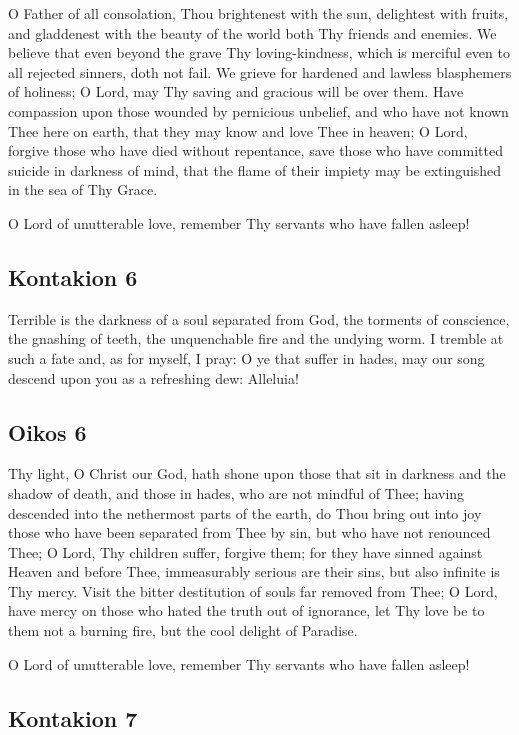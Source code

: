 O Father of all consolation, Thou brightenest with the sun, delightest with fruits, and gladdenest with the beauty of the world both Thy friends and enemies. We believe that even beyond the grave Thy loving-kindness, which is merciful even to all rejected sinners, doth not fail. We grieve for hardened and lawless blasphemers of holiness; O Lord, may Thy saving and gracious will be over them. Have compassion upon those wounded by pernicious unbelief, and who have not known Thee here on earth, that they may know and love Thee in heaven; O Lord, forgive those who have died without repentance, save those who have committed suicide in darkness of mind, that the flame of their impiety may be extinguished in the sea of Thy Grace.

O Lord of unutterable love, remember Thy servants who have fallen asleep!

\subsection{Kontakion 6}

Terrible is the darkness of a soul separated from God, the torments of conscience, the gnashing of teeth, the unquenchable fire and the undying worm. I tremble at such a fate and, as for myself, I pray: O ye that suffer in hades, may our song descend upon you as a refreshing dew: Alleluia!

\subsection{Oikos 6}

Thy light, O Christ our God, hath shone upon those that sit in darkness and the shadow of death, and those in hades, who are not mindful of Thee; having descended into the nethermost parts of the earth, do Thou bring out into joy those who have been separated from Thee by sin, but who have not renounced Thee; O Lord, Thy children suffer, forgive them; for they have sinned against Heaven and before Thee, immeasurably serious are their sins, but also infinite is Thy mercy. Visit the bitter destitution of souls far removed from Thee; O Lord, have mercy on those who hated the truth out of ignorance, let Thy love be to them not a burning fire, but the cool delight of Paradise.

O Lord of unutterable love, remember Thy servants who have fallen asleep!

\subsection{Kontakion 7}

